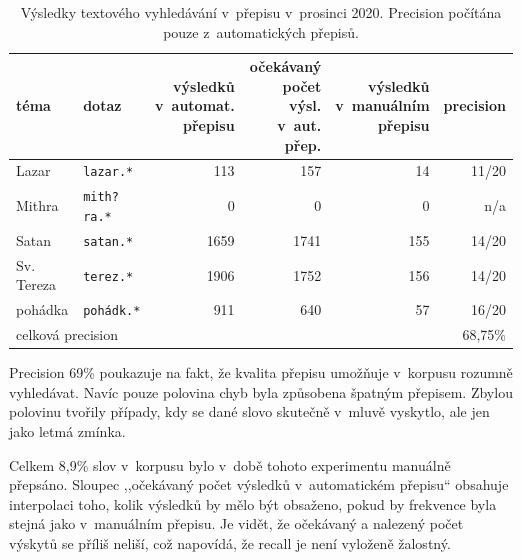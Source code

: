 \begin{table}[htpb]
\begin{center}
\begin{tabular}{|l|l|r|r|r|r|}
\hline
téma &
dotaz &
\makecell{výsledků\\ v~automat.\\ přepisu} &
\makecell{očekávaný\\ počet výsl.\\ v~aut. přep.} &
\makecell{výsledků\\ v~manuálním\\ přepisu} &
precision \\
\hline
Lazar & \texttt{lazar.*} & 113 & 157 & 14 & 11/20   \\
Mithra & \texttt{mith?ra.*} & 0 & 0 & 0 & n/a   \\
Satan & \texttt{satan.*} & 1659 & 1741 & 155 & 14/20   \\
Sv. Tereza & \texttt{terez.*} & 1906 & 1752 & 156 & 14/20   \\
pohádka & \texttt{pohádk.*} & 911 & 640 & 57 & 16/20   \\
\hline
\multicolumn{5}{|l|}{celková precision} & 68,75\%\\
\hline
\end{tabular}
\caption{Výsledky textového vyhledávání v~přepisu v~prosinci 2020. Precision počítána pouze
z~automatických přepisů.}\label{tab:topicsearch}
\end{center}
\end{table}


Precision 69\% poukazuje na fakt, že
kvalita přepisu umožňuje v~korpusu rozumně vyhledávat.
Navíc pouze polovina chyb byla způsobena špatným přepisem. Zbylou polovinu
tvořily případy, kdy se dané slovo skutečně v~mluvě vyskytlo, ale jen jako letmá
zmínka.

Celkem 8,9\% slov v~korpusu bylo v~době tohoto experimentu manuálně přepsáno. Sloupec ,,očekávaný počet
výsledků v~automatickém přepisu`` obsahuje interpolaci toho, kolik výsledků by
mělo být obsaženo, pokud by frekvence byla stejná jako v~manuálním přepisu.
Je vidět, že očekávaný a nalezený počet výskytů se příliš neliší, což napovídá,
že recall je není vyloženě žalostný.

